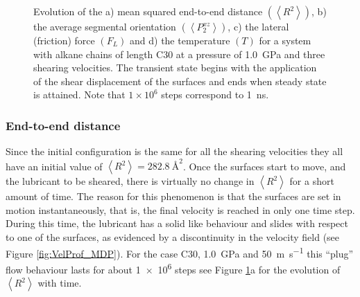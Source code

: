 \documentclass[aps,prb,reprint,superscriptaddress, a4paper]{revtex4-1}
\begin{document}
\begin{figure}
\begin{center}
		\caption{Evolution of the a) mean squared end-to-end distance $\left(\left< R^2 \right>\right)$, b) the average segmental orientation  $\left(\left<P_{2}^{xz}\right>\right)$, c) the lateral (friction) force  $\left(F_L\right)$ and d) the temperature $\left(T\right)$ for a system with alkane chains of length C30 at a pressure of \SI{1.0}{\giga\pascal} and  three  shearing velocities. The transient state begins with the application of the shear displacement of the surfaces and ends when  steady state is attained. Note that $1 \times 10^{6}$ steps correspond to  \SI{1}{\nano\second}.}
		\label{fig:SS}
	\end{center}
 \end{figure}

\subsubsection{End-to-end distance}

Since the initial configuration is the same for all the shearing velocities they all have an initial value of  $\left< R^2 \right> = \SI{282.8}{\angstrom\squared}$. Once the surfaces start to move, and the lubricant to be sheared, there is virtually no change in $\left< R^2 \right> $ for a short amount of time. The reason for this phenomenon is that the surfaces are set in motion  instantaneously, that is, the final velocity is reached in only one time step. During this time, the lubricant has a solid like behaviour and slides with respect to one of the surfaces, as evidenced by a discontinuity in the velocity field (see Figure \ref{fig:VelProf_MDP}). For the case C30, \SI{1.0}{\giga\pascal} and \SI{50}{\meter\per\second} this ``plug'' flow  behaviour  lasts for about \SI{1e6}{} steps see Figure \ref{fig:SS}a for the evolution of $\left< R^2 \right> $ with time.
\end{document}
